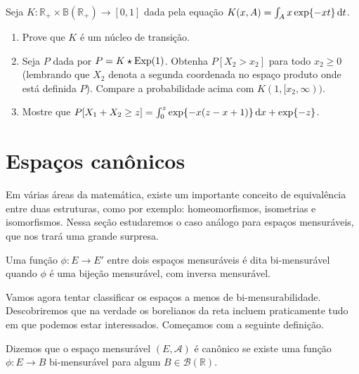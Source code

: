 \begin{exercise}
  Seja $K:\mathbb{R}_+ \times \mathbb{B}(\mathbb{R}_+) \to [0,1]$ dada pela equação $K(x,A) = \int_A x \exp\{-x t\} \mathop{}\!\mathrm{d} t$.
  \begin{enumerate}[\quad a)]
  \item Prove que $K$ \'e um n\'ucleo de transi\c{c}\~ao.
  \item Seja $P$ dada por $P = K \star \textnormal{Exp}(1)$.
    Obtenha $P[X_2 > x_2]$ para todo $x_2 \geq 0$ (lembrando que $X_2$ denota a segunda coordenada no espa\c{c}o produto onde est\'a definida $P$).
    Compare a probabilidade acima com $K(1,[x_2, \infty))$.
  \item Mostre que $P[X_1 + X_2 \geq z] = \int_0^z \exp \{-x(z-x+1)\} \mathop{}\!\mathrm{d} x + \exp\{-z\}$.
  \end{enumerate}
\end{exercise}

\vfill
\pagebreak

\section{Espaços canônicos}

Em várias áreas da matemática, existe um importante conceito de equivalência entre duas estruturas, como por exemplo: homeomorfismos, isometrias e isomorfismos.
Nessa seção estudaremos o caso análogo para espaços mensuráveis, que nos trará uma grande surpresa.

\begin{definition}
  Uma função $\phi:E \to E'$ entre dois espaços mensuráveis é dita bi-mensurável  quando $\phi$ é uma bijeção mensurável, com inversa mensurável.
\end{definition}

Vamos agora tentar classificar os espaços a menos de bi-mensurabilidade.
Descobriremos que na verdade os borelianos da reta incluem praticamente tudo em que podemos estar interessados.
Começamos com a seguinte definição.

\begin{definition}
  Dizemos que o espaço mensurável $(E, \mathcal{A})$ é canônico  se existe uma função $\phi: E \to B$ bi-mensurável para algum $B \in \mathcal{B}(\mathbb{R})$.
\end{definition}

